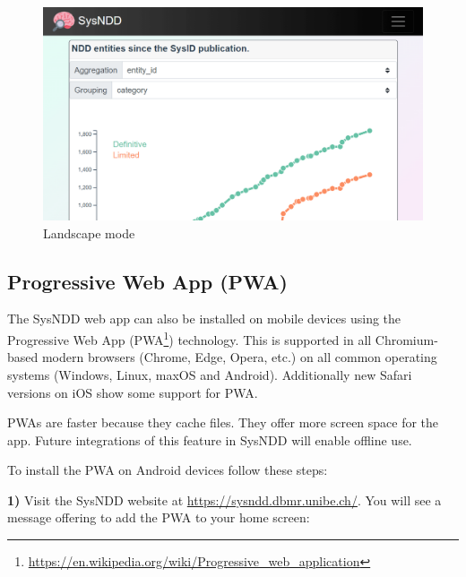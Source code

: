 \documentclass[
]{article}
\renewcommand{\href}[2]{#2\footnote{\url{#1}}}
\begin{document}
\begin{figure}
\centering
\includegraphics{./static/img/02_23-mobile-analyses-landscape.png}
\caption{Landscape mode}
\end{figure}

\hypertarget{progressive-web-app-pwa}{%
\subsection{Progressive Web App (PWA)}\label{progressive-web-app-pwa}}

The SysNDD web app can also be installed on mobile devices using the Progressive Web App (\href{https://en.wikipedia.org/wiki/Progressive_web_application}{PWA}) technology.
This is supported in all Chromium-based modern browsers (Chrome, Edge, Opera, etc.) on all common operating systems (Windows, Linux, maxOS and Android).
Additionally new Safari versions on iOS show some support for PWA.

PWAs are faster because they cache files. They offer more screen space for the app. Future integrations of this feature in SysNDD will enable offline use.

To install the PWA on Android devices follow these steps:

\textbf{1)} Visit the SysNDD website at \url{https://sysndd.dbmr.unibe.ch/}. You will see a message offering to add the PWA to your home screen:
\end{document}
